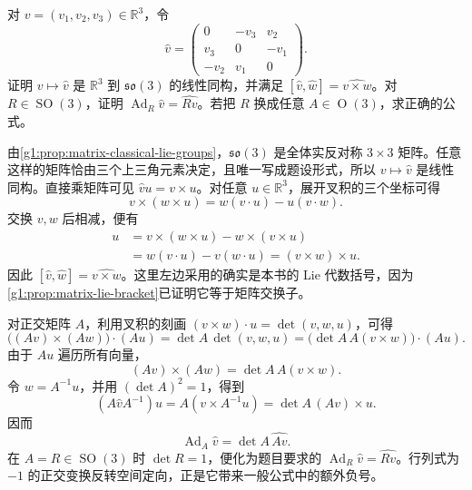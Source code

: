 \begin{exercise}\label{g1:ex:so-three-cross-product}
	对 \(v=(v_1,v_2,v_3)\in\mathbb R^3\)，令
	\[
		\widehat v=
		\begin{pmatrix}
			0&-v_3&v_2\\
			v_3&0&-v_1\\
			-v_2&v_1&0
		\end{pmatrix}.
	\]
	证明 \(v\mapsto\widehat v\) 是 \(\mathbb R^3\) 到 \(\mathfrak{so}(3)\) 的线性同构，并满足 \([\widehat v,\widehat w]=\widehat{v\times w}\)。对 \(R\in\operatorname{SO}(3)\)，证明 \(\operatorname{Ad}_R\widehat v=\widehat{Rv}\)。若把 \(R\) 换成任意 \(A\in\operatorname{O}(3)\)，求正确的公式。
\end{exercise}
\begin{solution}
	由\cref{g1:prop:matrix-classical-lie-groups}，\(\mathfrak{so}(3)\) 是全体实反对称 \(3\times3\) 矩阵。任意这样的矩阵恰由三个上三角元素决定，且唯一写成题设形式，所以 \(v\mapsto\widehat v\) 是线性同构。直接乘矩阵可见 \(\widehat vu=v\times u\)。对任意 \(u\in\mathbb R^3\)，展开叉积的三个坐标可得
	\[
		v\times(w\times u)=w(v\cdot u)-u(v\cdot w).
	\]
	交换 \(v,w\) 后相减，便有
	\begin{align*}
		[\widehat v,\widehat w]u
		&=v\times(w\times u)-w\times(v\times u)\\
		&=w(v\cdot u)-v(w\cdot u)=(v\times w)\times u.
	\end{align*}
	因此 \([\widehat v,\widehat w]=\widehat{v\times w}\)。这里左边采用的确实是本书的 Lie 代数括号，因为\cref{g1:prop:matrix-lie-bracket}已证明它等于矩阵交换子。

	对正交矩阵 \(A\)，利用叉积的刻画 \((v\times w)\cdot u=\det(v,w,u)\)，可得
	\[
		\bigl((Av)\times(Aw)\bigr)\cdot(Au)
		=\det A\,\det(v,w,u)
		=\bigl(\det A\,A(v\times w)\bigr)\cdot(Au).
	\]
	由于 \(Au\) 遍历所有向量，
	\[
		(Av)\times(Aw)=\det A\,A(v\times w).
	\]
	令 \(w=A^{-1}u\)，并用 \((\det A)^2=1\)，得到
	\[
		(A\widehat v A^{-1})u=A(v\times A^{-1}u)
		=\det A\,(Av)\times u.
	\]
	因而
	\[
		\operatorname{Ad}_A\widehat v=\det A\,\widehat{Av}.
	\]
	在 \(A=R\in\operatorname{SO}(3)\) 时 \(\det R=1\)，便化为题目要求的 \(\operatorname{Ad}_R\widehat v=\widehat{Rv}\)。行列式为 \(-1\) 的正交变换反转空间定向，正是它带来一般公式中的额外负号。
\end{solution}

